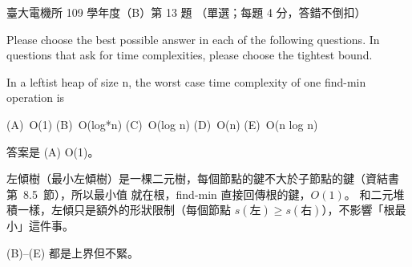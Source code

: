 \begin{pastexam}[label={px:ntu-109-ee-ds-13}]{臺大電機所 109 學年度（B）第 13 題}
（單選；每題 4 分，答錯不倒扣）

Please choose the best possible answer in each of the following questions. In questions that ask
for time complexities, please choose the tightest bound.

In a leftist heap of size n, the worst case time complexity of one find-min operation is

(A)~O(1) \qquad (B)~O(log*n) \qquad (C)~O(log n) \qquad (D)~O(n) \qquad (E)~O(n log n)
\end{pastexam}

\begin{pastsoln}
答案是 (A) O(1)。

左傾樹（最小左傾樹）是一棵二元樹，每個節點的鍵不大於子節點的鍵（資結書第~8.5~節），所以最小值
就在根，find-min 直接回傳根的鍵，$O(1)$。 和二元堆積一樣，左傾只是額外的形狀限制（每個節點
$s(\text{左}) \ge s(\text{右})$），不影響「根最小」這件事。

(B)--(E) 都是上界但不緊。
\end{pastsoln}
